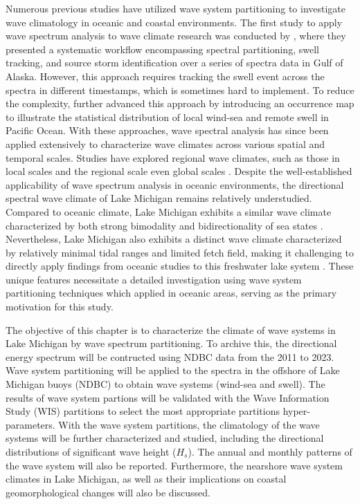 Numerous previous studies have utilized wave system partitioning to investigate
wave climatology in oceanic and coastal environments. The first study to apply
wave spectrum analysis to wave climate research was conducted by
\citet{hanson_automated_2001}, where they presented a systematic workflow
encompassing spectral partitioning, swell tracking, and source storm
identification over a series of spectra data in Gulf of Alaska. However, this
approach requires tracking the swell event across the spectra in different
timestamps, which is sometimes hard to implement. To reduce the complexity,
\citet{portilla-yandun_wave_2015,portilla-yandun_climate_2016} further advanced
this approach by introducing an occurrence map to illustrate the statistical
distribution of local wind-sea and remote swell in Pacific Ocean. With these
approaches, wave spectral analysis has since been applied extensively to
characterize wave climates across various spatial and temporal scales. Studies
have explored regional wave climates, such as those in local scales
\citep{romano-moreno_multimodal_2023,venolia_historical_2024,zheng_investigation_2024}
and the regional scale
\citep{jiang_wave_2019,langodan_unraveling_2018,portilla-yandun_climate_2016,stopa2016comparison}
even global scales
\citep{echevarria_seasonal_2019,echevarria_influence_2020,portilla2018global}.
Despite the well-established applicability of wave spectrum analysis in oceanic
environments, the directional spectral wave climate of Lake Michigan remains
relatively understudied. Compared to oceanic climate, Lake Michigan exhibits a
similar wave climate characterized by both strong bimodality and
bidirectionality of sea states \citep{rogers2007directional,jensen_lake_2012}.
Nevertheless, Lake Michigan also exhibits a distinct wave climate characterized
by relatively minimal tidal ranges and limited fetch field, making it
challenging to directly apply findings from oceanic studies to this freshwater
lake system \citep{trebitz2006characterizing,alves2014operational}. These unique
features necessitate a detailed investigation using wave system partitioning
techniques which applied in oceanic areas, serving as the primary motivation for
this study.

The objective of this chapter is to characterize the climate of wave systems in
Lake Michigan by wave spectrum partitioning. To archive this, the directional
energy spectrum will be contructed using NDBC data from the 2011 to 2023. Wave
system partitioning will be applied to the spectra in the offshore of Lake
Michigan buoys (NDBC) to obtain wave systems (wind-sea and swell). The results
of wave system partions will be validated with the Wave Information Study (WIS)
partitions to select the most appropriate partitions hyper-parameters. With the
wave system partitions, the climatology of the wave systems will be further
characterized and studied, including the directional distributions of
significant wave height ($H_s$). The annual and monthly patterns of the wave
system will also be reported. Furthermore, the nearshore wave system climates in
Lake Michigan, as well as their implications on coastal geomorphological changes
will also be discussed.

